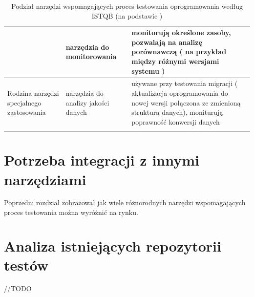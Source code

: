 \begin{longtable}{| p{4cm} | p{4cm} | p{8cm} |}
& narzędzia do monitorowania & monitorują określone zasoby, pozwalają na analizę porównawczą ( na przykład między różnymi wersjami systemu ) \\ \hline
\hline
\multirow{1}{4cm}{Rodzina narzędzi specjalnego zastosowania} &
narzędzia do analizy jakości danych & używane przy testowania migracji ( aktualizacja oprogramowania do nowej wersji połączona ze zmienioną strukturą danych), moniturują poprawność konwersji danych \\
\hline
\caption{Podział narzędzi wspomagających proces testowania oprogramowania według ISTQB (na podstawie  \cite{istqb})}\\
\end{longtable}

\section{Potrzeba integracji z innymi narzędziami}

Poprzedni rozdział zobrazował jak wiele różnorodnych narzędzi wspomagających proces testowania można wyróżnić na rynku.

\section{Analiza istniejących repozytorii testów}

//TODO










